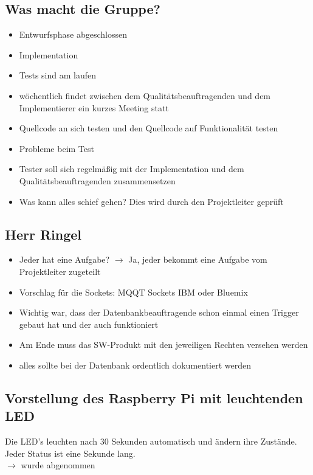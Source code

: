 \documentclass{scrartcl}
\begin{document}
\subsection{Was macht die Gruppe?}
\begin{itemize}
	\item Entwurfsphase abgeschlossen
	\item Implementation
	\item Tests sind am laufen
	\item wöchentlich findet zwischen dem Qualitätsbeauftragenden und dem Implementierer ein kurzes Meeting statt
	\item Quellcode an sich testen und den Quellcode auf Funktionalität testen
	\item Probleme beim Test 
	\item Tester soll sich regelmäßig mit der Implementation und dem Qualitätsbeauftragenden zusammensetzen 
	\item Was kann alles schief gehen? Dies wird durch den Projektleiter geprüft
\end{itemize}

\subsection{Herr Ringel}
\begin{itemize}
	\item Jeder hat eine Aufgabe? $\rightarrow$ Ja, jeder bekommt eine Aufgabe vom Projektleiter zugeteilt
	\item Vorschlag für die Sockets: MQQT Sockets IBM oder Bluemix
	\item Wichtig war, dass der Datenbankbeauftragende schon einmal einen Trigger gebaut hat und der auch funktioniert
	\item Am Ende muss das SW-Produkt mit den jeweiligen Rechten versehen werden
	\item alles sollte bei der Datenbank ordentlich dokumentiert werden
\end{itemize}

\subsection{Vorstellung des Raspberry Pi mit leuchtenden LED}
Die LED's leuchten nach 30 Sekunden automatisch und ändern ihre Zustände.\\
Jeder Status ist eine Sekunde lang. \\
$\rightarrow$ wurde abgenommen
\end{document}
